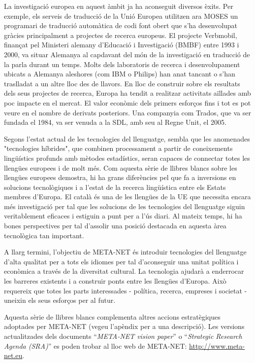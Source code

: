 \documentclass[]{../../metanetpaper}
\begin{document}
\begin{multicols}{2}
La investigació europea en aquest àmbit ja ha aconseguit diversos èxits. Per exemple, els serveis de traducció de la Unió Europea utilitzen ara  MOSES un programari de traducció automàtica de codi font obert que s'ha desenvolupat gràcies principalment a projectes de recerca europeus. El projecte Verbmobil, finançat pel Ministeri alemany d'Educació i Investigació (BMBF) entre 1993 i 2000, va situar Alemanya al capdavant del món de la investigació en traducció de la parla durant un temps. Molts dels laboratoris de recerca i desenvolupament ubicats a Alemanya aleshores (com IBM o Philips) han anat tancant o s'han traslladat a un altre lloc des de llavors. En lloc de construir sobre els resultats dels seus projectes de recerca, Europa ha tendit a realitzar activitats aïllades amb poc impacte en el mercat. El valor econòmic dels primers esforços fins i tot es pot veure en el nombre de derivats posteriors. Una companyia com Trados, que va ser fundada el 1984, va ser venuda a la SDL, amb seu al Regne Unit, el 2005.


Segons l'estat actual de les tecnologies del llenguatge, sembla que les anomenades "tecnologies híbrides", que combinen processament a partir de coneixements lingüístics profunds amb mètodes estadístics, seran capaces de connectar totes les llengües europees i de molt més. Com aquesta sèrie de llibres blancs sobre les llengües europees demostra, hi ha grans diferències  pel que fa a inversions en solucions tecnològiques i a l'estat de la recerca lingüística entre els Estats membres d'Europa. El català és una de les llengües de la UE que necessita encara més investigació per tal que les solucions de les tecnologies del llenguatge siguin veritablement eficaces i estiguin a punt per a l’ús diari. Al mateix temps, hi ha bones perspectives per tal d'assolir una posició destacada en aquesta àrea tecnològica tan important.

 A llarg termini, l’objectiu de META-NET és introduir tecnologies del llenguatge d'alta qualitat  per a tots els idiomes per tal d'aconseguir una unitat política i econòmica a través de la diversitat cultural. La tecnologia ajudarà a enderrocar les barreres existents i a construir ponts entre les llengües d'Europa. Això requereix que totes les parts interessades - política, recerca, empreses i societat - uneixin els seus esforços per al futur.

Aquesta sèrie de llibres blancs complementa altres accions estratègiques adoptades per META-NET (vegeu l'apèndix per a una descripció). Les versions actualitzades dels documents “\textit{META-NET vision paper}” \cite{Meta1} o “\textit{Strategic Research Agenda (SRA)}” es poden trobar al lloc web de META-NET: \url{http://www.meta-net.eu}.
\end{multicols}
\end{document}
